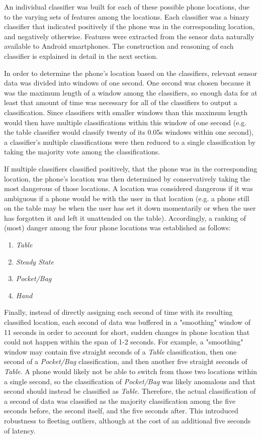 \documentclass{article}
\begin{document}
An individual classifier was built for each of these possible phone locations, due to the varying sets of features among
the locations. Each classifier was a binary classifier that indicated positively if the phone was in the corresponding location,
and negatively otherwise. Features were extracted from the sensor data naturally available to Android smartphones. The construction
and reasoning of each classifier is explained in detail in the next section.

In order to determine the phone's location based on the classifiers, relevant sensor data was divided into windows of one second. One second
was chosen because it was the maximum length of a window among the classifiers, so enough data for at least that amount of time was necessary
for all of the classifiers to output a classification. Since classifiers with smaller windows than this maximum length would then have multiple 
classifications within this window of one second (e.g. the table classifier would classify twenty of its 0.05s windows within one second), a classifier's
multiple classifications were then reduced to a single classification by taking the majority vote among the classifications. 

If multiple classifiers classified positively, that the phone was in the corresponding location, the phone's location was then determined by conservatively taking the most dangerous
of those locations. A location was considered dangerous if it was ambiguous if a phone would be with the user in that location (e.g. a phone still on the table
may be when the user has set it down momentarily or when the user has forgotten it and left it unattended on the table). Accordingly, a ranking of (most) danger
among the four phone locations was established as follows:
\begin{enumerate}
\item \textit{Table}
\item \textit{Steady State}
\item \textit{Pocket/Bag}
\item \textit{Hand}
\end{enumerate}

Finally, instead of directly assigning each second of time with its resulting classified location, each second of data was buffered in a "smoothing" window 
of 11 seconds in order to account for short, sudden changes in phone location that could not happen within the span of 1-2 seconds. For example, a 
"smoothing" window may contain five straight seconds of a \textit{Table} classification, then one second of a \textit{Pocket/Bag} classification, and then 
another five straight seconds of \textit{Table}. A phone would likely not be able to switch from those two locations within a single second, so the classification
of \textit{Pocket/Bag} was likely anomalous and that second should instead be classified as \textit{Table}. Therefore, the actual classification of a second of
data was classified as the majority classification among the five seconds before, the second itself, and the five seconds after. This introduced robustness
to fleeting outliers, although at the cost of an additional five seconds of latency. 
\end{document}
